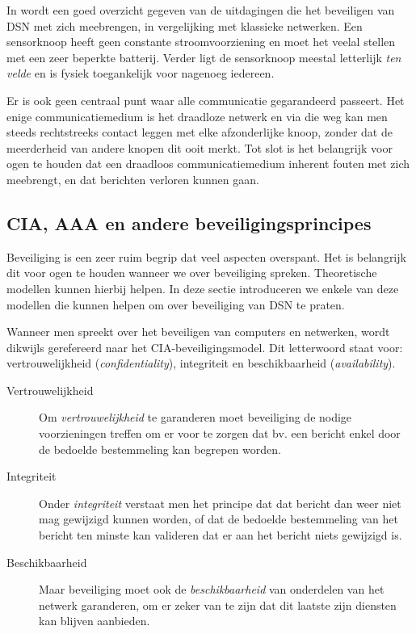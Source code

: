 In \citep{dargie2010fundamentals} wordt een goed overzicht gegeven van de
uitdagingen die het beveiligen van DSN met zich meebrengen, in vergelijking met
klassieke netwerken. Een sensorknoop heeft geen constante stroomvoorziening en
moet het veelal stellen met een zeer beperkte batterij. Verder ligt de
sensorknoop meestal letterlijk \emph{ten velde} en is fysiek toegankelijk voor
nagenoeg iedereen.

Er is ook geen centraal punt waar alle communicatie gegarandeerd passeert. Het
enige communicatiemedium is het draadloze netwerk en via die weg kan men steeds
rechtstreeks contact leggen met elke afzonderlijke knoop, zonder dat de
meerderheid van andere knopen dit ooit merkt. Tot slot is het belangrijk voor
ogen te houden dat een draadloos communicatiemedium inherent fouten met zich
meebrengt, en dat berichten verloren kunnen gaan.

\subsection{CIA, AAA en andere beveiligingsprincipes}
\label{subsection:cia}

Beveiliging is een zeer ruim begrip dat veel aspecten overspant. Het is
belangrijk dit voor ogen te houden wanneer we over beveiliging spreken.
Theoretische modellen kunnen hierbij helpen. In deze sectie introduceren we
enkele van deze modellen die kunnen helpen om over beveiliging van DSN te
praten.

Wanneer men spreekt over het beveiligen van computers en netwerken, wordt
dikwijls gerefereerd naar het CIA-beveiligingsmodel. Dit letterwoord staat
voor: vertrouwelijkheid (\emph{confidentiality}), integriteit en
beschikbaarheid (\emph{availability}).

\begin{description}

  \item[Vertrouwelijkheid] Om \emph{vertrouwelijkheid} te garanderen moet
  beveiliging de nodige voorzieningen treffen om er voor te zorgen dat bv. een
  bericht enkel door de bedoelde bestemmeling kan begrepen worden.
  
  \item[Integriteit] Onder \emph{integriteit} verstaat men het principe dat dat
  bericht dan weer niet mag gewijzigd kunnen worden, of dat de bedoelde
  bestemmeling van het bericht ten minste kan valideren dat er aan het bericht
  niets gewijzigd is. 
  
  \item[Beschikbaarheid] Maar beveiliging moet ook de \emph{beschikbaarheid}
  van onderdelen van het netwerk garanderen, om er zeker van te zijn dat dit
  laatste zijn diensten kan blijven aanbieden.

\end{description}

